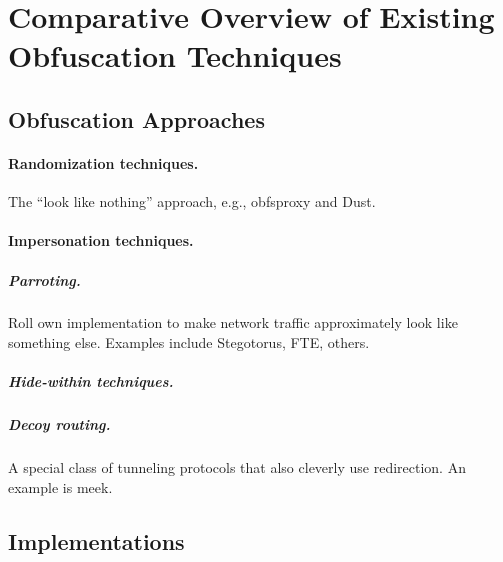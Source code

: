 %
\section{Comparative Overview of Existing Obfuscation Techniques}
\label{section:comparison} 

\subsection{Obfuscation Approaches}

\paragraph{Randomization techniques.}
The ``look like nothing'' approach, e.g., obfsproxy and Dust. 

\paragraph{Impersonation techniques.}

\subparagraph{Parroting.} 	Roll own implementation to make network traffic
approximately look like something else. Examples include Stegotorus, FTE,
others.

\subparagraph{Hide-within techniques.}

\subparagraph{Decoy routing.} 
A special class of tunneling protocols that also cleverly use redirection. An
example is meek. 




\subsection{Implementations}


